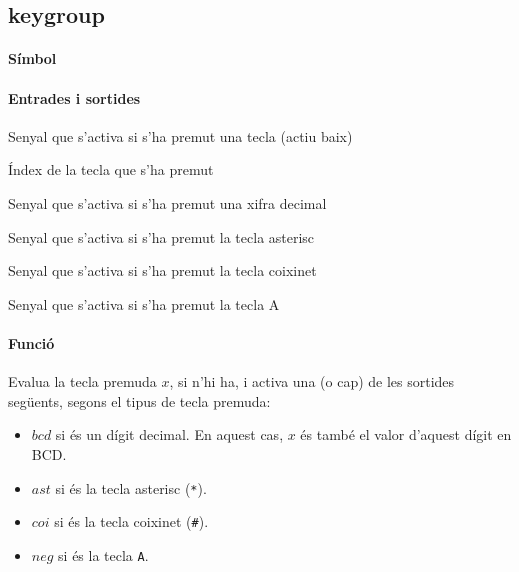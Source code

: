 \subsection{\label{sub:\projectname-keygroup} \textsf{keygroup}}

\paragraph{Símbol}

\begin{center}  \end{center}

\paragraph{Entrades i sortides}

\begin{where}
\item[\nodenamebit{nkey}] Senyal que s'activa si s'ha premut una tecla (actiu baix)
\item[\nodenamerange{x}{3}{0}] Índex de la tecla que s'ha premut
\item[\nodenamebit{bcd}] Senyal que s'activa si s'ha premut una xifra decimal
\item[\nodenamebit{ast}] Senyal que s'activa si s'ha premut la tecla asterisc
\item[\nodenamebit{coi}] Senyal que s'activa si s'ha premut la tecla coixinet
\item[\nodenamebit{coi}] Senyal que s'activa si s'ha premut la tecla A
\end{where}

\paragraph{Funció}

Evalua la tecla premuda $x$, si n'hi ha, i activa una (o cap) de les sortides següents,
segons el tipus de tecla premuda:

\begin{itemize}
\item $bcd$ si és un dígit decimal. En aquest cas, $x$ és també
el valor d'aquest dígit en BCD.
\item $ast$ si és la tecla asterisc (\texttt{*}).
\item $coi$ si és la tecla coixinet (\texttt{\#}).
\item $neg$ si és la tecla \texttt{A}.
\end{itemize}

